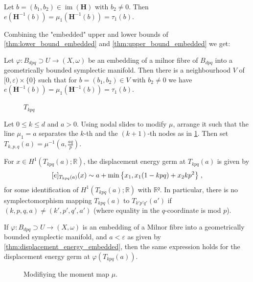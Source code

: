 \documentclass[12pt,a4paper,draft]{scrartcl}
\DeclareMathOperator{\im}{im}
\begin{document}
\begin{theorem}
  \label{thm:displacement_energy}
  Let $b=(b_1,b_2) ∈ \im(\symbf{H})$ with $b_2 ≠ 0$. Then $e(\symbf{H}^{-1}(b)) = μ_1(\symbf{H}^{-1}(b)) = τ_1(b)$.
\end{theorem}

Combining the "embedded" upper and lower bounds of \cref{thm:lower_bound_embedded} and \cref{thm:upper_bound_embedded} we get:

\begin{theorem}
  \label{thm:displacement_energy_embedded}
  Let $φ \colon B_{dpq} ⊃ U → (X,ω)$ be an embedding of a milnor fibre of $B_{dpq}$ into a geometrically bounded symplectic manifold. Then there is a neighbourhood $V$ of $[0,ε) × \{0\}$ such that for $b = (b_1,b_2) ∈ V$ with $b_2 ≠ 0$ we have $e(\symbf{H}^{-1}(b)) = μ_1(\symbf{H}^{-1}(b)) = τ_1(b)$.
\end{theorem}

\begin{figure}
  \centering
  \caption{$T_{kpq}$}
  \label{fig:tkpq_def}
\end{figure}

\begin{definition}
  Let $0 ≤ k ≤ d$ and $a>0$.
  Using nodal slides to modify $μ$, arrange it such that the line $μ_1 = a$ separates the $k$-th and the $(k+1)$-th nodes as in \cref{fig:tkpq_def}.
  Then set $T_{k,p,q}(a) = μ^{-1}(a,\frac{aq}{p})$.
\end{definition}

\begin{theorem}
  \label{thm:main}

  For $x ∈ H^1(T_{kpq}(a); ℝ)$, the displacement energy germ at $T_{kpq}(a)$ is given by
  \[ [e]_{T_{kpq}(a)} (x) \sim a + \min\qty{x_1, x_1 (1-kpq) + x_2 k p^2} \; , \]
  for some identification of $H^1(T_{kpq}(a);ℝ)$ with $ℝ²$.
  In particular, there is no symplectomorphism mapping $T_{kpq}(a)$ to $T_{k'p'q'}(a')$ if $(k,p,q,a) ≠ (k',p',q',a')$ (where equality in the $q$-coordinate is mod $p$).

  If $φ \colon B_{dpq} ⊃ U → (X,ω)$ is an embedding of a Milnor fibre into a geometrically bounded symplectic manifold, and $a<ε$ as given by \cref{thm:displacement_energy_embedded}, then the same expression holds for the displacement energy germ at $φ(T_{kpq}(a))$.
\end{theorem}

\begin{figure}
  \centering
  \caption{Modifiying the moment map $μ$.}
  \label{fig:mod_moment_map}
\end{figure}
\end{document}

